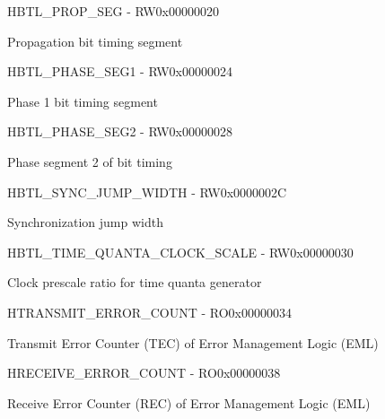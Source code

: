 \documentclass{article}
\begin{document}
\begin{register}{H}{BTL{\_}PROP{\_}SEG - RW}{0x00000020}  \par Propagation bit timing segment \regnewline
  \label{BTL_PROP_SEG}
\regnewline
\end{register}

\begin{register}{H}{BTL{\_}PHASE{\_}SEG1 - RW}{0x00000024}  \par Phase 1 bit timing segment \regnewline
  \label{BTL_PHASE_SEG1}
\regnewline
\end{register}

\begin{register}{H}{BTL{\_}PHASE{\_}SEG2 - RW}{0x00000028}  \par Phase segment 2 of bit timing \regnewline
  \label{BTL_PHASE_SEG2}
\regnewline
\end{register}

\begin{register}{H}{BTL{\_}SYNC{\_}JUMP{\_}WIDTH - RW}{0x0000002C}  \par Synchronization jump width \regnewline
  \label{BTL_SYNC_JUMP_WIDTH}
\regnewline
\end{register}

\begin{register}{H}{BTL{\_}TIME{\_}QUANTA{\_}CLOCK{\_}SCALE - RW}{0x00000030}  \par Clock prescale ratio for time quanta generator \regnewline
  \label{BTL_TIME_QUANTA_CLOCK_SCALE}
\regnewline
\end{register}

\begin{register}{H}{TRANSMIT{\_}ERROR{\_}COUNT - RO}{0x00000034}  \par Transmit Error Counter (TEC) of Error Management Logic (EML) \regnewline
  \label{TRANSMIT_ERROR_COUNT}
\regnewline
\end{register}

\begin{register}{H}{RECEIVE{\_}ERROR{\_}COUNT - RO}{0x00000038}  \par Receive Error Counter (REC) of Error Management Logic (EML) \regnewline
  \label{RECEIVE_ERROR_COUNT}
\regnewline
\end{register}
\end{document}
